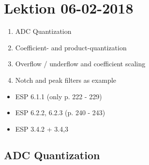 \section{Lektion 06-02-2018}

\begin{enumerate}
	\item ADC Quantization
	\item Coefficient- and product-quantization
	\item Overflow / underflow and coefficient scaling
	\item Notch and peak filters as example
\end{enumerate}

\begin{mdframed}[style=exampledefault]
\begin{itemize}
	\item ESP 6.1.1 (only p. 222 - 229)
	\item ESP 6.2.2, 6.2.3 (p. 240 - 243)
	\item ESP 3.4.2 + 3.4,3
\end{itemize}
\end{mdframed}

\subsection{ADC Quantization}

